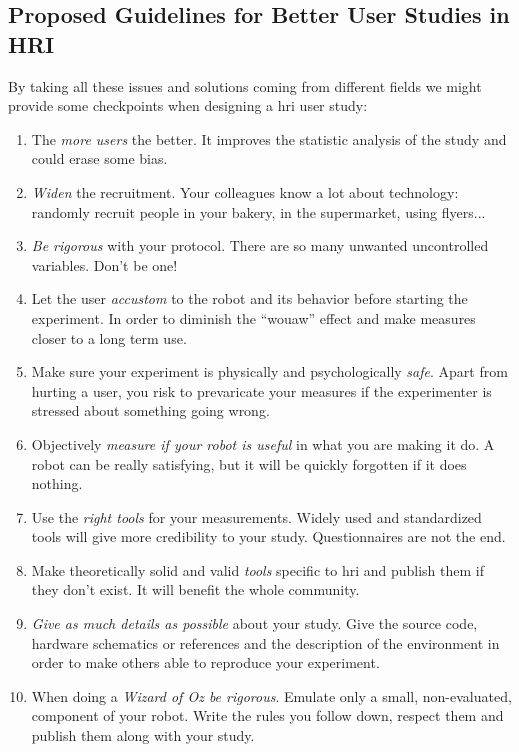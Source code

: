 \documentclass[a4paper,11pt,twoside]{StyleThese}
\begin{document}
\subsection{Proposed Guidelines for Better User Studies in HRI}
By taking all these issues and solutions coming from different fields we might provide some checkpoints when designing a \acrshort{hri} user study:
\begin{enumerate}
    \item The \textit{more users} the better. It improves the statistic analysis of the study and could erase some bias.
    \item \textit{Widen} the recruitment. Your colleagues know a lot about technology: randomly recruit people in your bakery, in the supermarket, using flyers...
    \item \textit{Be rigorous} with your protocol. There are so many unwanted uncontrolled variables. Don't be one!
    \item Let the user \textit{accustom} to the robot and its behavior before starting the experiment. In order to diminish the ``wouaw'' effect and make measures closer to a long term use.
    \item Make sure your experiment is physically and psychologically \textit{safe}. Apart from hurting a user, you risk to prevaricate your measures if the experimenter is stressed about something going wrong.
    \item Objectively \textit{measure if your robot is useful} in what you are making it do. A robot can be really satisfying, but it will be quickly forgotten if it does nothing.
    \item Use the \textit{right tools} for your measurements. Widely used and standardized tools will give more credibility to your study. Questionnaires are not the end.
    \item Make theoretically solid and valid \textit{tools} specific to \acrshort{hri} and publish them if they don't exist. It will benefit the whole community.
    \item \textit{Give as much details as possible} about your study. Give the source code, hardware schematics or references and the description of the environment in order to make others able to reproduce your experiment.
    \item When doing a \textit{Wizard of Oz be rigorous}. Emulate only a small, non-evaluated, component of your robot. Write the rules you follow down, respect them and publish them along with your study.
\end{enumerate}
\end{document}
